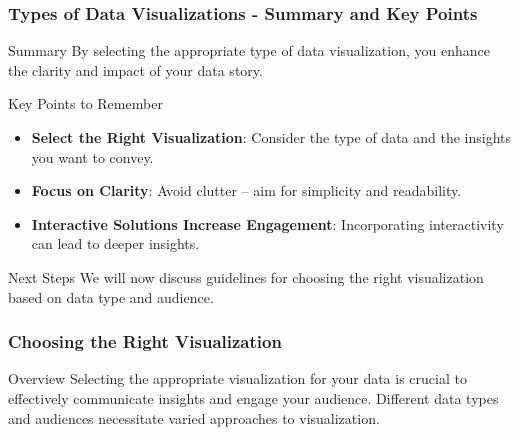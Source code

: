 \documentclass{beamer}
\begin{document}
\begin{frame}[fragile]
    \frametitle{Types of Data Visualizations - Summary and Key Points}
    \begin{block}{Summary}
        By selecting the appropriate type of data visualization, you enhance the clarity and impact of your data story. 
    \end{block}

    \begin{block}{Key Points to Remember}
        \begin{itemize}
            \item \textbf{Select the Right Visualization}: Consider the type of data and the insights you want to convey.
            \item \textbf{Focus on Clarity}: Avoid clutter – aim for simplicity and readability.
            \item \textbf{Interactive Solutions Increase Engagement}: Incorporating interactivity can lead to deeper insights.
        \end{itemize}
    \end{block}

    \begin{block}{Next Steps}
        We will now discuss guidelines for choosing the right visualization based on data type and audience.
    \end{block}
\end{frame}

\begin{frame}[fragile]
    \frametitle{Choosing the Right Visualization}
    \begin{block}{Overview}
        Selecting the appropriate visualization for your data is crucial to effectively communicate insights and engage your audience. Different data types and audiences necessitate varied approaches to visualization.
    \end{block}
\end{frame}
\end{document}
